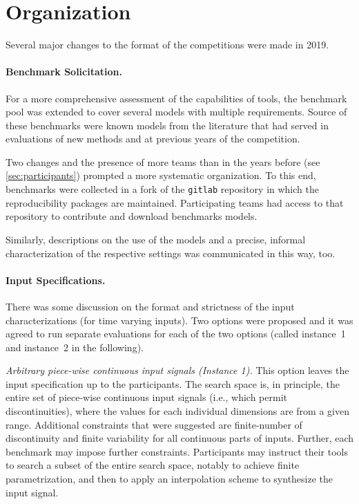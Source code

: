 \documentclass[a4paper]{easychair}
\begin{document}
	\section{Organization}
	\label{sec:organization}

	Several major changes to the format of the competitions were made in 2019.

	\paragraph{Benchmark Solicitation.}

	For a more comprehensive assessment of the capabilities of tools,
    the benchmark pool was extended to cover several models with
    multiple requirements.  Source of these benchmarks were known
    models from the literature that had served in evaluations of new
    methods and at previous years of the competition.

	Two changes and the presence of more teams than in the years
    before (see \cref{sec:participants}) prompted a more systematic
    organization.  To this end, benchmarks were collected in a fork of
    the \texttt{gitlab} repository in which the reproducibility
    packages are maintained.  Participating teams had access to that
    repository to contribute and download benchmarks models.

	Similarly, descriptions on the use of the models and a precise,
    informal characterization of the respective settings was
    communicated in this way, too.

    \paragraph{Input Specifications.}

	There was some discussion on the format and strictness of the
    input characterizations (for time varying inputs).  Two options
    were proposed and it was agreed to run separate evaluations for
    each of the two options (called instance~1 and instance~2 in the
    following).

	\emph{Arbitrary piece-wise continuous input signals (Instance 1).}
    This option leaves the input specification up to the participants.
    The search space is, in principle, the entire set of piece-wise
    continuous input signals (i.e., which permit discontinuities),
    where the values for each individual
    dimensions are from a given range.  Additional constraints that
    were suggested are finite-number of discontinuity and finite
    variability for all continuous parts of inputs.  Further, each
    benchmark may impose further constraints.  Participants may
    instruct their tools to search a subset of the entire search
    space, notably to achieve finite parametrization, and then to
    apply an interpolation scheme to synthesize the input signal.
\end{document}
